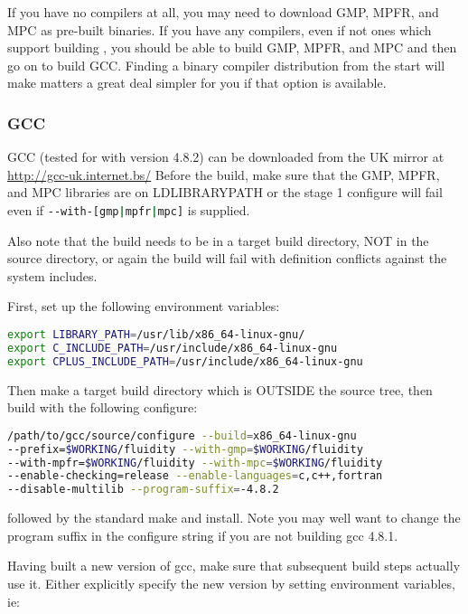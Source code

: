 If you have no compilers at all, you may need to download GMP, MPFR, and MPC as
pre-built binaries. If you have any compilers, even if not ones which support
building \fluidity, you should be able to build GMP, MPFR, and MPC and then go
on to build GCC. Finding a binary compiler distribution from the start will
make matters a great deal simpler for you if that option is available.

\subsubsection{GCC}
\label{sec:required_libraries_compilers_gcc}

GCC (tested for \fluidity with version 4.8.2) can be downloaded from the UK mirror at
\url{http://gcc-uk.internet.bs/} Before the build, make sure that the GMP,
MPFR, and MPC libraries are on LD{\textunderscore}LIBRARY{\textunderscore}PATH
or the stage 1 configure will fail even if
\lstinline[language=bash]+--with-[gmp|mpfr|mpc]+ is supplied.

Also note that the build needs to be in a target build directory, NOT in the
source directory, or again the build will fail with definition conflicts
against the system includes.

First, set up the following environment variables:
\begin{lstlisting}[language=bash]
export LIBRARY_PATH=/usr/lib/x86_64-linux-gnu/
export C_INCLUDE_PATH=/usr/include/x86_64-linux-gnu
export CPLUS_INCLUDE_PATH=/usr/include/x86_64-linux-gnu
\end{lstlisting}

Then make a target build directory which is OUTSIDE the source tree, then build
with the following configure:

\begin{lstlisting}[language=bash]
/path/to/gcc/source/configure --build=x86_64-linux-gnu
--prefix=$WORKING/fluidity --with-gmp=$WORKING/fluidity
--with-mpfr=$WORKING/fluidity --with-mpc=$WORKING/fluidity
--enable-checking=release --enable-languages=c,c++,fortran
--disable-multilib --program-suffix=-4.8.2
\end{lstlisting}

followed by the standard make and install. Note you may well want to change the
program suffix in the configure string if you are not building gcc 4.8.1.

Having built a new version of gcc, make sure that subsequent build steps
actually use it. Either explicitly specify the new version by setting
environment variables, ie:

